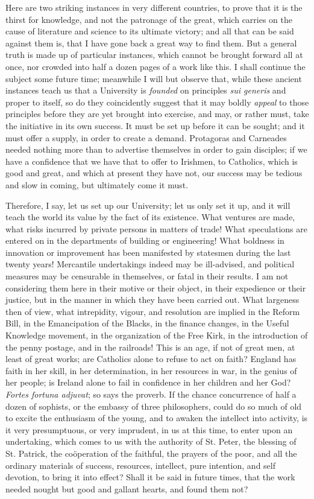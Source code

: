 Here are two striking instances in very different countries, to
prove that it is the thirst for knowledge, and not the patronage of
the great, which carries on the cause of literature and science to its
ultimate victory; and all that can be said against them is, that I
have gone back a great way to find them. But a general truth is made
up of particular instances, which cannot be brought forward all at
once, nor crowded into half a dozen pages of a work like this. I shall
continue the subject some future time; meanwhile I will but observe
that, while these ancient instances teach us that a University is \emph{founded}
on principles \emph{sui generis} and proper to itself, so do they
coincidently suggest that it may boldly \emph{appeal} to those
principles before they are yet brought into exercise, and may, or
rather must, take the initiative in its own success. It must be set up
before it can be sought; and it must offer a supply, in order to
create a demand. Protagoras and Carneades needed nothing more than to
advertise themselves in order to gain disciples; if we have a
confidence that we have that to offer to Irishmen, to Catholics, which
is good and great, and which at present they have not, our success may
be tedious and slow in coming, but ultimately come it must.

Therefore, I say, let us set up our University; let us only set it
up, and it will teach the world its value by the fact of its
existence. What ventures are made, what risks incurred by private
persons in matters of trade! What speculations are entered on in the
departments of building or engineering! What boldness in innovation or
improvement has been manifested by statesmen during the last twenty
years! Mercantile undertakings indeed may be ill-advised, and
political measures may be censurable in themselves, or fatal in their
results. I am not considering them here in their motive or their
object, in their expedience or their justice, but in the manner in
which they have been carried out. What largeness then of view, what
intrepidity, vigour, and resolution are implied in the Reform Bill, in
the Emancipation of the Blacks, in the finance changes, in the Useful
Knowledge movement, in the organization of the Free Kirk, in the
introduction of the penny postage, and in the railroads! This is an
age, if not of great men, at least of great works; are Catholics alone
to refuse to act on faith? England has faith in her skill, in her
determination, in her resources in war, in the genius of her people;
is Ireland alone to fail in confidence in her children and her God? \emph{Fortes
fortuna adjuvat}; so says the proverb. If the chance concurrence of
half a dozen of sophists, or the embassy of three philosophers, could
do so much of old to excite the enthusiasm of the young, and to awaken
the intellect into activity, is it very presumptuous, or very
imprudent, in us at this time, to enter upon an undertaking, which
comes to us with the authority of St. Peter, the blessing of St.
Patrick, the coöperation of the faithful, the prayers of the poor,
and all the ordinary materials of success, resources, intellect, pure
intention, and self devotion, to bring it into effect? Shall it be
said in future times, that the work needed nought but good and gallant
hearts, and found them not?

